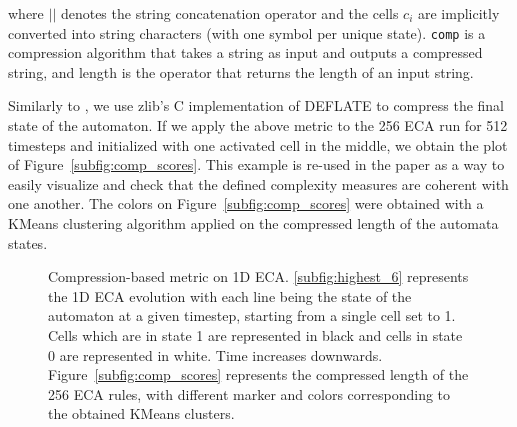 where $||$ denotes the string concatenation operator and the cells $c_i$ are
implicitly converted into string characters (with one symbol per unique state).
\texttt{comp} is a compression algorithm that takes a string as input and
outputs a compressed string, and length is the operator that returns the length
of an input string.

Similarly to \parencite{kowaliw_measures_2008, zenil_compression-based_2010}, we use
zlib’s C implementation of DEFLATE to compress the final state of the automaton.
If we apply the above metric to the 256 ECA run for 512 timesteps and
initialized with one activated cell in the middle, we obtain the plot of
Figure~\ref{subfig:comp_scores}. This example is re-used in the paper as a way
to easily visualize and check that the defined complexity measures are coherent
with one another. The colors on Figure~\ref{subfig:comp_scores} were obtained
with a KMeans clustering algorithm applied on the compressed length of the
automata states.

\begin{figure}[tbp]
  \centering {}
  \hfil
  \caption{Compression-based metric on 1D ECA. \ref{subfig:highest_6} represents
    the 1D ECA evolution with each line being the state of the automaton at a
    given timestep, starting from a single cell set to 1. Cells which are in
    state 1 are represented in black and cells in state 0 are represented in
    white. Time increases downwards. Figure~\ref{subfig:comp_scores} represents
    the compressed length of the 256 ECA rules, with different marker and colors
    corresponding to the obtained KMeans clusters.}
  \label{fig:comp_eca}
\end{figure}


